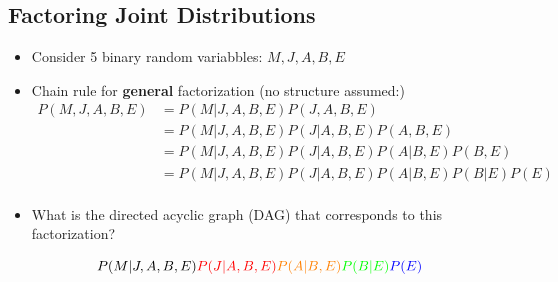 \documentclass[10pt]{article}
\begin{document}
\subsection*{Factoring Joint Distributions}
\begin{itemize}
	\item Consider 5 binary random variabbles: $M, J, A, B, E$
	\item Chain rule for \textbf{general} factorization (no structure assumed:)
	\begin{align*}
        P(M, J, A, B, E) &= P(M | J, A, B, E) P(J, A, B, E) \\
        &= P(M | J, A, B, E) P(J | A, B, E) P(A, B, E) \\
        &= P(M | J, A, B, E) P(J | A, B, E) P(A | B, E) P(B, E) \\
        &= P(M | J, A, B, E) P(J | A, B, E) P(A | B, E) P(B | E) P(E) \\
    \end{align*}
    \item What is the directed acyclic graph (DAG) that corresponds to this factorization?
\end{itemize}
\[P(M | J, A, B, E) \textcolor{red}{P(J | A, B, E)} \textcolor{orange}{P(A | B, E)} \textcolor{green}{P(B | E)} \textcolor{blue}{P(E)}\]
\begin{center} 
\end{center}
\end{document}
